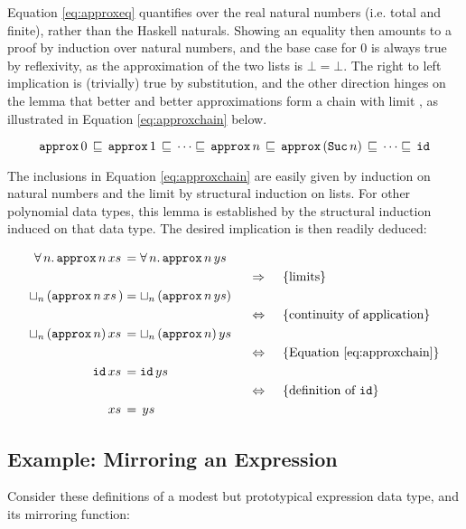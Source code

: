 Equation \ref{eq:approxeq} quantifies over the real natural numbers
(i.e. total and finite), rather than the Haskell naturals. Showing an
equality then amounts to a proof by induction over natural numbers,
and the base case for $0$ is always true by reflexivity, as the
approximation of the two lists is $\bot = \bot$. The right to left
implication is (trivially) true by substitution, and the other
direction hinges on the lemma that better and better approximations
form a chain with limit , as illustrated in Equation
\ref{eq:approxchain} below.

\begin{equation}
\label{eq:approxchain}
\hs{approx} \, 0 \,
   \sqsubseteq \,
\hs{approx} \, 1 \,
   \sqsubseteq \,
\cdots
   \sqsubseteq \,
\hs{approx} \, n \,
   \sqsubseteq \,
\hs{approx} \, (\hs{Suc} \, n) \,
   \sqsubseteq \,
\cdots
   \sqsubseteq \,
\hs{id}
\end{equation}

The inclusions in Equation \ref{eq:approxchain} are easily given by
induction on natural numbers and the limit by structural induction on
lists.  For other polynomial data types, this lemma is established by
the structural induction induced on that data type.  The desired
implication is then readily deduced:

\begin{align*}
\xsys{\fa{n} \hs{approx} \, n}{}            \\
\descra{limits}                             \\
\xsys{\lub{n} \, (\hs{approx} \, n}{)}      \\
\desclra{continuity of application}   \\
\xsys{\lub{n} \, (\hs{approx} \, n)}{}      \\
\desclra{Equation \ref{eq:approxchain}} \\
\xsys{\hs{id}}{}                            \\
\desclra{definition of \hs{id}}       \\
\xsys{}{}                                   \\
\end{align*}

\subsection{Example: Mirroring an Expression}

Consider these definitions of a modest but prototypical expression
data type, and its mirroring function:

